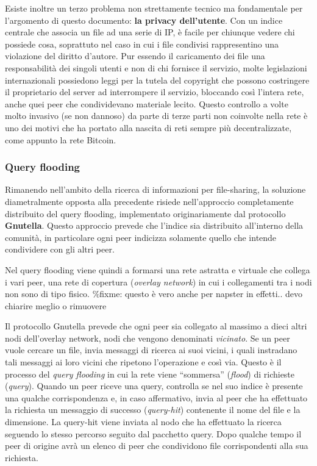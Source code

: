 Esiste inoltre un terzo problema non strettamente tecnico ma
fondamentale per l'argomento di questo documento: \textbf{la privacy
dell'utente}. Con un indice centrale che associa un file ad una serie di
IP, è facile per chiunque vedere chi possiede cosa, soprattuto nel caso
in cui i file condivisi rappresentino una violazione del diritto
d'autore. Pur essendo il caricamento dei file una responsabilità dei
singoli utenti e non di chi fornisce il servizio, molte legislazioni
internazionali possiedono leggi per la tutela del copyright che possono
costringere il proprietario del server ad interrompere il servizio,
bloccando così l'intera rete, anche quei peer che condividevano
materiale lecito. Questo controllo a volte molto invasivo (se non
dannoso) da parte di terze parti non coinvolte nella rete è uno dei
motivi che ha portato alla nascita di reti sempre più decentralizzate,
come appunto la rete Bitcoin.

\subsubsection{Query flooding}\label{query-flooding}

Rimanendo nell'ambito della ricerca di informazioni per file-sharing, la
soluzione diametralmente opposta alla precedente risiede nell'approccio
completamente distribuito del query flooding, implementato
originariamente dal protocollo \textbf{Gnutella}. Questo approccio
prevede che l'indice sia distribuito all'interno della comunità, in
particolare ogni peer indicizza solamente quello che intende condividere
con gli altri peer.

Nel query flooding viene quindi a formarsi una rete astratta e virtuale
che collega i vari peer, una rete di copertura (\emph{overlay network})
in cui i collegamenti tra i nodi non sono di tipo fisico. \%fixme:
questo è vero anche per napster in effetti.. devo chiarire meglio o
rimuovere

Il protocollo Gnutella prevede che ogni peer sia collegato al massimo a
dieci altri nodi dell'overlay network, nodi che vengono denominati
\emph{vicinato}. Se un peer vuole cercare un file, invia messaggi di
ricerca ai suoi vicini, i quali instradano tali messaggi ai loro vicini
che ripetono l'operazione e così via. Questo è il processo del
\emph{query flooding} in cui la rete viene ``sommersa'' (\emph{flood})
di richieste (\emph{query}). Quando un peer riceve una query, controlla
se nel suo indice è presente una qualche corrispondenza e, in caso
affermativo, invia al peer che ha effettuato la richiesta un messaggio
di successo (\emph{query-hit}) contenente il nome del file e la
dimensione. La query-hit viene inviata al nodo che ha effettuato la
ricerca seguendo lo stesso percorso seguito dal pacchetto query. Dopo
qualche tempo il peer di origine avrà un elenco di peer che condividono
file corrispondenti alla sua richiesta.

